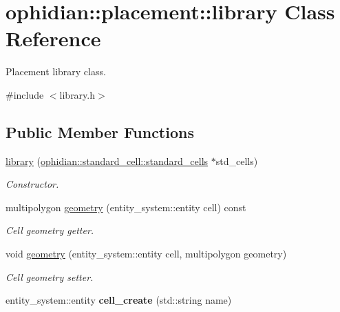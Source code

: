 \hypertarget{classophidian_1_1placement_1_1library}{\section{ophidian\-:\-:placement\-:\-:library Class Reference}
\label{classophidian_1_1placement_1_1library}
}


Placement library class.  




{\ttfamily \#include $<$library.\-h$>$}

\subsection*{Public Member Functions}
\begin{DoxyCompactItemize}
\item 
\hyperlink{classophidian_1_1placement_1_1library_a33f89c4a0aa6a5f27a0f7b6b1021bac5}{library} (\hyperlink{classophidian_1_1standard__cell_1_1standard__cells}{ophidian\-::standard\-\_\-cell\-::standard\-\_\-cells} $\ast$std\-\_\-cells)
\begin{DoxyCompactList}\small\item\em Constructor. \end{DoxyCompactList}\item 
multipolygon \hyperlink{classophidian_1_1placement_1_1library_a9e81e6910d8379558bc889c238408c9a}{geometry} (entity\-\_\-system\-::entity cell) const 
\begin{DoxyCompactList}\small\item\em Cell geometry getter. \end{DoxyCompactList}\item 
void \hyperlink{classophidian_1_1placement_1_1library_a3089f4b661d6fac3eb019def747bac88}{geometry} (entity\-\_\-system\-::entity cell, multipolygon geometry)
\begin{DoxyCompactList}\small\item\em Cell geometry setter. \end{DoxyCompactList}\item 
\hypertarget{classophidian_1_1placement_1_1library_a744f661b787df31c021ab1e96998a0c4}{entity\-\_\-system\-::entity {\bfseries cell\-\_\-create} (std\-::string name)}\label{classophidian_1_1placement_1_1library_a744f661b787df31c021ab1e96998a0c4}


\end{DoxyCompactItemize}

